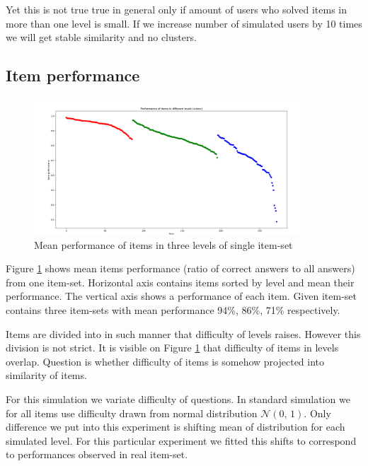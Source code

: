 \documentclass[
  digital, %
  table,   %
  nolof,     %
  nolot,     %
  nocover,
  color
]{fithesis3}
\begin{document}
Yet this is not true true in general only if amount of users who solved items in more than one level is small. If we increase number of simulated users by 10 times we will get stable similarity and no clusters.


\subsection{Item performance}\label{item-performance}

\begin{figure}
  \includegraphics[width=10cm]{img/items_performance_levels}
  \caption{Mean performance of items in three levels of single item-set}
  \label{fig:item_performance_levels}
\end{figure}

Figure \ref{fig:item_performance_levels} shows mean items performance (ratio of correct answers to all answers) from one item-set. Horizontal axis contains items sorted by level and mean their performance. The vertical axis shows a performance of each item. Given item-set contains three item-sets with mean performance 94\%, 86\%, 71\% respectively.

Items are divided into in such manner that difficulty of levels raises. However this division is not strict. It is visible on Figure \ref{fig:item_performance_levels} that difficulty of items in levels overlap. Question is whether difficulty of items is somehow projected into similarity of items.

For this simulation we variate difficulty of questions. In standard simulation we for all items use difficulty drawn from normal distribution $\mathcal{N}(0,\,1)$. Only difference we put into this experiment is shifting mean of distribution for each simulated level. For this particular experiment we fitted this shifts to correspond to performances observed in real item-set.
\end{document}
